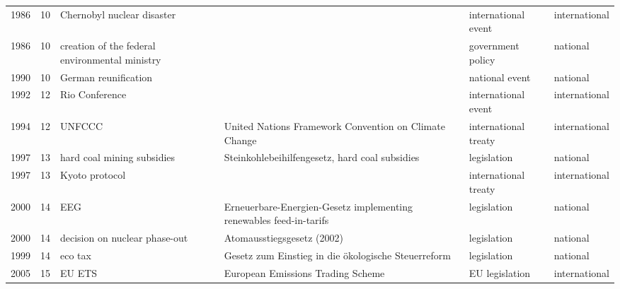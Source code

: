 \begin{longtable}{rrL{3cm}L{5cm}lL{3cm}}
 1986 &                    10 &                              Chernobyl nuclear disaster &                                                                                      &   international event &  international \\
 1986 &                    10 &          creation of the federal environmental ministry &                                                                                      &     government policy &       national \\
 1990 &                    10 &                                    German reunification &                                                                                      &        national event &       national \\
 1992 &                    12 &                                          Rio Conference &                                                                                      &   international event &  international \\
 1994 &                    12 &                                                  UNFCCC &                                United Nations Framework Convention on Climate Change &  international treaty &  international \\
 1997 &                    13 &                              hard coal mining subsidies &                                       Steinkohlebeihilfengesetz, hard coal subsidies &           legislation &       national \\
 1997 &                    13 &                                          Kyoto protocol &                                                                                      &  international treaty &  international \\
 2000 &                    14 &                                                     EEG &                   Erneuerbare-Energien-Gesetz implementing renewables feed-in-tarifs &           legislation &       national \\
 2000 &                    14 &                           decision on nuclear phase-out &                                                           Atomausstiegsgesetz (2002) &           legislation &       national \\
 1999 &                    14 &                                                 eco tax &                                  Gesetz zum Einstieg in die ökologische Steuerreform &           legislation &       national \\
 2005 &                    15 &                                                  EU ETS &                                                    European Emissions Trading Scheme &        EU legislation &  international \\

\end{longtable}
